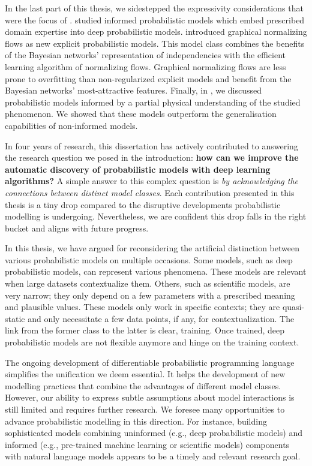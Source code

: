 In the last part of this thesis, we sidestepped the expressivity considerations that were the focus of .   studied informed probabilistic models which embed prescribed domain expertise into deep probabilistic models.  introduced graphical normalizing flows as new explicit probabilistic models. This model class combines the benefits of the Bayesian networks' representation of independencies with the efficient learning algorithm of normalizing flows. Graphical normalizing flows are less prone to overfitting than non-regularized explicit models and benefit from the Bayesian networks' most-attractive features. Finally, in , we discussed probabilistic models informed by a partial physical understanding of the studied phenomenon. We showed that these models outperform the generalisation capabilities of non-informed models. %

In four years of research, this dissertation has actively contributed to answering the research question we posed in the introduction: \textbf{how can we improve the automatic discovery of probabilistic models with deep learning algorithms?} A simple answer to this complex question is \textit{by acknowledging the connections between distinct model classes}. Each contribution presented in this thesis is a tiny drop compared to the disruptive developments probabilistic modelling is undergoing. Nevertheless, we are confident this drop falls in the right bucket and aligns with future progress.

In this thesis, we have argued for reconsidering the artificial distinction between various probabilistic models on multiple occasions. Some models, such as deep probabilistic models, can represent various phenomena. These models are relevant when large datasets contextualize them. Others, such as scientific models, are very narrow; they only depend on a few parameters with a prescribed meaning and plausible values. These models only work in specific contexts; they are quasi-static and only necessitate a few data points, if any, for contextualization. The link from the former class to the latter is clear, training. Once trained, deep probabilistic models are not flexible anymore and hinge on the training context.

The ongoing development of differentiable probabilistic programming language simplifies the unification we deem essential. It helps the development of new modelling practices that combine the advantages of different model classes. However, our ability to express subtle assumptions about model interactions is still limited and requires further research. We foresee many opportunities to advance probabilistic modelling in this direction. For instance, building sophisticated models combining uninformed (e.g., deep probabilistic models) and informed (e.g., pre-trained machine learning or scientific models) components with natural language models appears to be a timely and relevant research goal.

